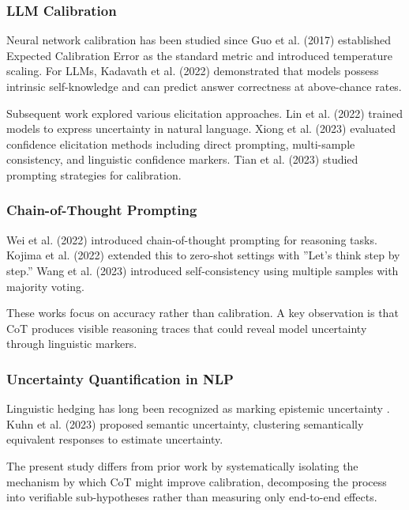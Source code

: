 
\subsubsection{LLM Calibration}

Neural network calibration has been studied since Guo et al. (2017) established Expected Calibration Error as the standard metric and introduced temperature scaling. For LLMs, Kadavath et al. (2022) demonstrated that models possess intrinsic self-knowledge and can predict answer correctness at above-chance rates.

Subsequent work explored various elicitation approaches. Lin et al. (2022) trained models to express uncertainty in natural language. Xiong et al. (2023) evaluated confidence elicitation methods including direct prompting, multi-sample consistency, and linguistic confidence markers. Tian et al. (2023) studied prompting strategies for calibration.

\subsubsection{Chain-of-Thought Prompting}

Wei et al. (2022) introduced chain-of-thought prompting for reasoning tasks. Kojima et al. (2022) extended this to zero-shot settings with ''Let's think step by step.'' Wang et al. (2023) introduced self-consistency using multiple samples with majority voting.

These works focus on accuracy rather than calibration. A key observation is that CoT produces visible reasoning traces that could reveal model uncertainty through linguistic markers.

\subsubsection{Uncertainty Quantification in NLP}

Linguistic hedging has long been recognized as marking epistemic uncertainty \citep{hyland1998hedging}. Kuhn et al. (2023) proposed semantic uncertainty, clustering semantically equivalent responses to estimate uncertainty.

The present study differs from prior work by systematically isolating the mechanism by which CoT might improve calibration, decomposing the process into verifiable sub-hypotheses rather than measuring only end-to-end effects.
